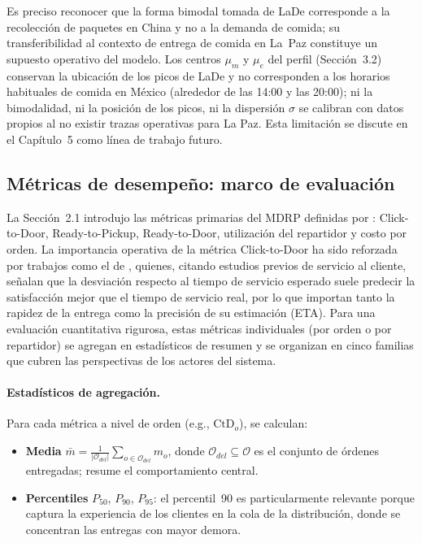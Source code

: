 \documentclass[12pt,letterpaper,oneside]{book}
\begin{document}
	Es preciso reconocer que la forma bimodal tomada de LaDe
	\citep{Wu2023LaDe} corresponde a la recolección de paquetes en China y
	no a la demanda de comida; su transferibilidad al contexto de entrega de
	comida en La~Paz constituye un supuesto operativo del modelo.  Los centros $\mu_m$ y $\mu_e$ del
	perfil (Sección~3.2) conservan la ubicación de los picos de LaDe y no
	corresponden a los horarios habituales de comida en México (alrededor
	de las 14:00 y las 20:00); ni la bimodalidad, ni la posición de los
	picos, ni la dispersión $\sigma$ se calibran con datos propios al no
	existir trazas operativas para La Paz.  Esta limitación se discute en el Capítulo~5 como línea de
	trabajo futuro.

	\subsection{Métricas de desempeño: marco de evaluación}

	La Sección~2.1 introdujo las métricas primarias del MDRP definidas por
	\citet{Reyes2018}: Click-to-Door, Ready-to-Pickup, Ready-to-Door,
	utilización del repartidor y costo por orden.  La importancia operativa
	de la métrica Click-to-Door ha sido reforzada por trabajos como el de
	\citet{Hildebrandt2021}, quienes, citando estudios previos de servicio
	al cliente, señalan que la desviación respecto al tiempo de servicio
	esperado suele predecir la satisfacción mejor que el tiempo de servicio
	real, por lo que importan tanto la rapidez de la entrega como la
	precisión de su estimación (ETA).  Para una evaluación
	cuantitativa rigurosa, estas métricas individuales (por orden o por
	repartidor) se agregan en estadísticos de resumen y se organizan en cinco
	familias que cubren las perspectivas de los actores del sistema.

	\paragraph{Estadísticos de agregación.}
	Para cada métrica a nivel de orden (e.g., $\text{CtD}_o$), se calculan:
	\begin{itemize}
		\item \textbf{Media} $\bar{m} = \frac{1}{|\mathcal{O}_{del}|}\sum_{o \in \mathcal{O}_{del}} m_o$,
		      donde $\mathcal{O}_{del} \subseteq \mathcal{O}$ es el conjunto de órdenes
		      entregadas; resume el comportamiento central.
		\item \textbf{Percentiles} $P_{50}$, $P_{90}$, $P_{95}$: el
		      percentil~90 es particularmente relevante porque captura la
		      experiencia de los clientes en la cola de la distribución, donde
		      se concentran las entregas con mayor demora.
	\end{itemize}
\end{document}
